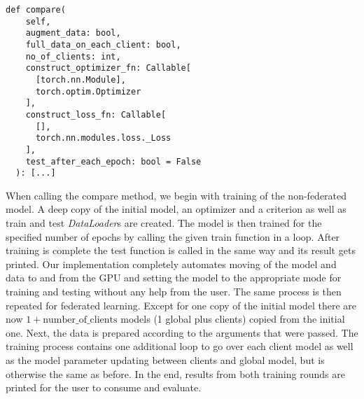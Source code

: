 \begin{lstlisting}[language=CustomPython, style=colorEX, caption=Automated federation learning compare method input, captionpos=t, label=lst:automated_fl_compare]
  def compare(
    self,
    augment_data: bool,
    full_data_on_each_client: bool,
    no_of_clients: int,
    construct_optimizer_fn: Callable[
      [torch.nn.Module],
      torch.optim.Optimizer
    ],
    construct_loss_fn: Callable[
      [],
      torch.nn.modules.loss._Loss
    ],
    test_after_each_epoch: bool = False
  ): [...]
\end{lstlisting}

When calling the compare method, we begin with training of the non-federated model. A deep copy of the initial model, an optimizer and a criterion as well as train and test \textit{DataLoader}s are created. The model is then trained for the specified number of epochs by calling the given train function in a loop. After training is complete the test function is called in the same way and its result gets printed. Our implementation completely automates moving of the model and data to and from the GPU and setting the model to the appropriate mode for training and testing without any help from the user.
The same process is then repeated for federated learning. Except for one copy of the initial model there are now $ 1 + \text{number\_of\_clients} $ models (1 global plus clients) copied from the initial one. Next, the data is prepared according to the arguments that were passed. The training process contains one additional loop to go over each client model as well as the model parameter updating between clients and global model, but is otherwise the same as before.
In the end, results from both training rounds are printed for the user to consume and evaluate.